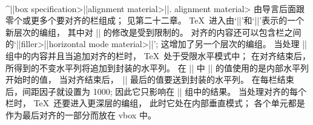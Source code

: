 \\^|\valign|\<box specification>|{|\<alignment material>|}|.\enskip
\<alignment material> 由导言后面跟零个或更多个要对齐的栏组成；
见第二十二章。%
 \TeX\ 进入由`|{|'和`|}|'表示的一个新层次的编组，
其中对 |\tabskip| 的修改是受到限制的。%
对齐的内容还可以包含栏之间的`|\noalign|\<filler>|{|\<horizontal mode material>|}|';
这增加了另一个层次的编组。%
当处理 |\noalign| 组中的内容并且当追加对齐的栏时， \TeX\ 处于受限水平模式中；
\1在对齐结束后，所得到的不变水平列将追加到封装的水平列。%
在 |\valign| 中 |\spacefactor| 的值使用的是内部水平列开始时的值，
当对齐结束后，~|\spacefactor| 最后的值要送到封装的水平列。%
在每栏结束后，间距因子就设置为 1000;
因此它只影响在 |\noalign| 组中的结果。%
当处理对齐的每个栏时， \TeX\ 还要进入更深层的编组，
此时它处在内部垂直模式；
各个单元都是作为最后对齐的一部分而放在 vbox 中。

